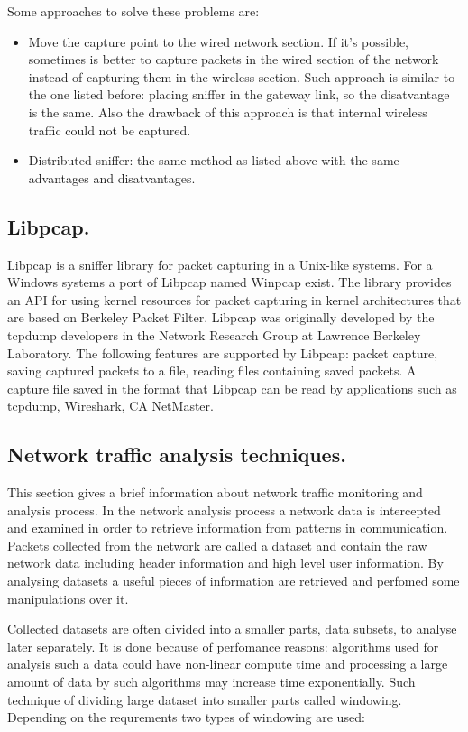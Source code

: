 \documentclass[thesis=M,english]{FITthesis}[2011/07/15]
\begin{document}
Some approaches to solve these problems are:
\begin{itemize}
\item Move the capture point to the wired network section. If it's possible, sometimes is better to capture packets in the wired section of the network instead of capturing them in the wireless section. Such approach is similar to the one listed before: placing sniffer in the gateway link, so the disatvantage is the same. Also the drawback of this approach is that internal wireless traffic could not be captured.

\item Distributed sniffer: the same method as listed above with the same advantages and disatvantages.
\end{itemize}

\subsection{Libpcap.}
Libpcap is a sniffer library for packet capturing in a Unix-like systems. For a Windows systems a port of Libpcap named Winpcap exist. The library provides an API for using kernel resources for packet capturing in kernel architectures that are based on Berkeley Packet Filter. Libpcap was originally developed by the tcpdump developers in the Network Research Group at Lawrence Berkeley Laboratory. The following features are supported by Libpcap: packet capture, saving captured packets to a file, reading files containing saved packets. A capture file saved in the format that Libpcap can be read by applications such as tcpdump, Wireshark, CA NetMaster.

\subsection{Network traffic analysis techniques.}
This section gives a brief information about network traffic monitoring and analysis process. In the network analysis process a network data is intercepted and examined in order to retrieve information from patterns in communication. Packets collected from the network are called a dataset and contain the raw network data including header information and high level user information. By analysing datasets a useful pieces of information are retrieved and perfomed some manipulations over it.

Collected datasets are often divided into a smaller parts, data subsets, to analyse later separately. It is done because of perfomance reasons: algorithms used for analysis such a data could have non-linear compute time and processing a large amount of data by such algorithms may increase time exponentially. Such technique of dividing large dataset into smaller parts called windowing. Depending on the requrements two types of windowing are used:
\end{document}

